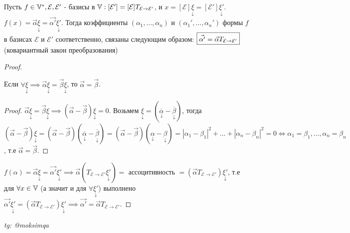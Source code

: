 \documentclass[../main.tex]{subfiles}
\begin{document}
\begin{theorem}
    Пусть $f \in \mathbb{V}^{*}, \mathcal{E}, \mathcal{E'}$ - базисы в $\mathbb{V}: [\mathcal{E'}]= [\mathcal{E}]T_{\mathcal{E}\to\mathcal{E'}}$, и $x = [ \mathcal{E}]\underset{\downarrow}{\xi} = [\mathcal{E'}]\underset{\downarrow}{\xi'}$. $f(x)=\vec{\alpha}\underset{\downarrow}{\xi} = \vec{\alpha'}\underset{\downarrow}{\xi'}$. Тогда коэффициенты $(\alpha_{1},\dots,\alpha_{n})$ и $(\alpha_{1}', \dots,\alpha_{n}')$  формы $f$ в базисах $\mathcal{E}$ и $\mathcal{E'}$ соответственно, связаны следующим образом: $\fbox{$\vec{\alpha'} = \vec{\alpha}T_{\mathcal{E}\to\mathcal{E'}}$}$ (ковариантный закон преобразования)
    
\end{theorem}
\begin{proof}
    \begin{corollary}
       
     Если $\forall \underset{\downarrow}{\xi} \implies \vec{\alpha} \underset{\downarrow}{\xi} = \vec{\beta}\underset{\downarrow}{\xi}$, то $\vec{\alpha} = \vec{\beta}$. 
    \end{corollary}
     \begin{proof}
            $\vec{\alpha}\underset{\downarrow}{\xi} = \vec{\beta}\underset{\downarrow}{\xi }\implies (\vec{\alpha}-\vec{\beta})\underset{\downarrow}{\xi} = 0$. Возьмем $\underset{\downarrow}{\xi} = (\underset{\downarrow}{\overline{\alpha}}-\underset{\downarrow}{\overline{\beta}})$, тогда $(\vec{\alpha}-\vec{\beta})\underset{\downarrow}{\xi} = (\vec{\alpha}-\vec{\beta})(\underset{\downarrow}{\overline{\alpha}}-\underset{\downarrow}{\overline{\beta}}) = (\vec{\alpha}-\vec{\beta})\overline{(\underset{\downarrow}{\alpha}-\underset{\downarrow}{\beta})} = |\alpha_{1}-\beta_{1}|^{2} + \dots+ |\alpha_{n}-\beta_{n}|^{2} = 0\Leftrightarrow \alpha_{1}=\beta_{1},\dots,\alpha_{n}=\beta_{n}$, т.е $\vec{\alpha} = \vec{\beta}$.
        \end{proof}
        $f(\alpha)=\vec{\alpha}\underset{\downarrow}{\xi} = \vec{\alpha'}\underset{\downarrow}{\xi'}\implies \vec{\alpha}(T_{\mathcal{E}\to\mathcal{E'}}\underset{\downarrow}{\xi'}) =$ ассоцитивность $ = (\vec{\alpha} T _{\mathcal{E}\to\mathcal{E'}})\underset{\downarrow}{\xi'}$, т.е для $\forall x \in \mathbb{V}$ (а значит и для $\forall \underset{\downarrow}{\xi'}$) выполнено $\vec{\alpha'}\underset{\downarrow}{\xi'} = (\vec{\alpha}T_{\mathcal{E}\to\mathcal{E'}})\underset{\downarrow}{\xi'}\implies \vec{\alpha'} = \vec{\alpha}T_{\mathcal{E}\to\mathcal{E'}}$.



\end{proof}



\vspace{1cm}
\begin{flushright}
    \textit{tg: @moksimqa}
\end{flushright}
\end{document}
